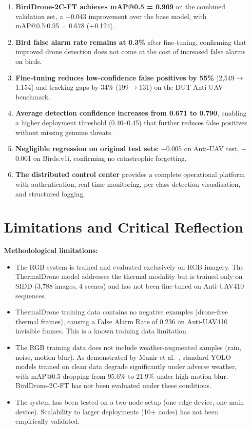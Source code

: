 \documentclass[12pt,a4paper]{report}
\begin{document}
\begin{enumerate}
  \item \textbf{BirdDrone-2C-FT achieves mAP@0.5 = 0.969} on the combined
        validation set, a +0.043 improvement over the base model, with
        mAP@0.5:0.95 = 0.678 (+0.124).
  \item \textbf{Bird false alarm rate remains at 0.3\%} after fine-tuning,
        confirming that improved drone detection does not come at the cost
        of increased false alarms on birds.
  \item \textbf{Fine-tuning reduces low-confidence false positives by 55\%}
        (2,549$\to$1,154) and tracking gaps by 34\% (199$\to$131) on the
        DUT Anti-UAV benchmark.
  \item \textbf{Average detection confidence increases from 0.671 to 0.790},
        enabling a higher deployment threshold (0.40--0.45) that further
        reduces false positives without missing genuine threats.
  \item \textbf{Negligible regression on original test sets}: $-$0.005 on
        Anti-UAV test, $-$0.001 on Birds.v1i, confirming no catastrophic
        forgetting.
  \item \textbf{The distributed control center} provides a complete
        operational platform with authentication, real-time monitoring,
        per-class detection visualisation, and structured logging.
\end{enumerate}

\section{Limitations and Critical Reflection}

\textbf{Methodological limitations:}
\begin{itemize}
  \item The RGB system is trained and evaluated exclusively on RGB imagery.
        The ThermalDrone model addresses the thermal modality but is trained
        only on SIDD (3,788 images, 4 scenes) and has not been fine-tuned
        on Anti-UAV410 sequences.
  \item ThermalDrone training data contains no negative examples (drone-free
        thermal frames), causing a False Alarm Rate of 0.236 on Anti-UAV410
        invisible frames. This is a known training data limitation.
  \item The RGB training data does not include weather-augmented samples
        (rain, noise, motion blur). As demonstrated by Munir et al.~\cite{munir2023kfupm},
        standard YOLO models trained on clean data degrade significantly
        under adverse weather, with mAP@0.5 dropping from 95.6\% to 21.9\%
        under high motion blur. BirdDrone-2C-FT has not been evaluated
        under these conditions.
  \item The system has been tested on a two-node setup (one edge device,
        one main device). Scalability to larger deployments (10+ nodes)
        has not been empirically validated.
\end{itemize}
\end{document}

